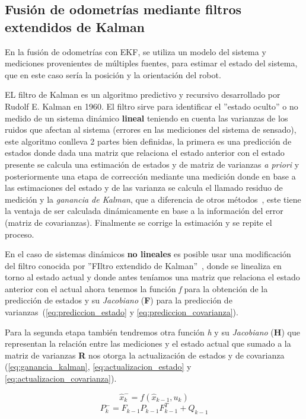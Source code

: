 \subsection{Fusión de odometrías mediante filtros extendidos de Kalman}

En la fusión de odometrías con EKF, se utiliza un modelo del sistema y mediciones provenientes de múltiples fuentes, para estimar el estado 
del sistema, que en este caso sería la posición y la orientación del robot.

EL filtro de Kalman es un algoritmo predictivo y recursivo desarrollado por Rudolf E. Kalman en 1960. El filtro sirve para identificar el ''estado oculto'' o no medido de un sistema dinámico \textbf{lineal} teniendo en cuenta las varianzas de 
los ruidos que afectan al sistema (errores en las mediciones del sistema de sensado), este algoritmo conlleva 2 partes 
bien definidas, la primera es una predicción de estados donde dada una matriz que relaciona el estado anterior con el estado presente 
se calcula una estimación de estados y de matriz de varianzas \textit{a priori} y posteriormente una etapa de corrección mediante una 
medición donde en base a las estimaciones del estado y de las varianza se calcula el llamado residuo de medición y la \textit{ganancia de Kalman}, 
que a diferencia de otros métodos~\cite{wikiLuenberg}, este tiene la ventaja de ser calculada dinámicamente en base a la información del error (matriz de covarianzas). 
Finalmente se corrige la estimación y se repite el proceso.

En el caso de sistemas dinámicos \textbf{no lineales} es posible usar una modificación del filtro conocida por ''FIltro extendido de Kalman''~\cite{rigatos2007extended}, donde 
se linealiza en torno al estado actual y donde antes teníamos una matriz que relaciona el estado anterior con el actual ahora tenemos la función \textit{f} 
para la obtención de la predicción de estados y su \textit{Jacobiano} (\textbf{F}) para la predicción de varianzas~(\ref{eq:prediccion_estado} y \ref{eq:prediccion_covarianza}).

Para la segunda etapa también tendremos otra función \textit{h} y su \textit{Jacobiano} (\textbf{H}) que representan la relación entre 
las mediciones y el estado actual que sumado a la matriz de varianzas \textbf{R} nos otorga la actualización de estados y de covarianza (\ref{eq:ganancia_kalman}, \ref{eq:actualizacion_estado} y \ref{eq:actualizacion_covarianza}). 

\begin{equation}\label{eq:prediccion_estado}
\hat{x}_k^- = f(\hat{x}_{k-1}, u_k) 
\end{equation}
\begin{equation}\label{eq:prediccion_covarianza}
P_k^- = F_{k-1}P_{k-1}F_{k-1}^T + Q_{k-1}
\end{equation}


